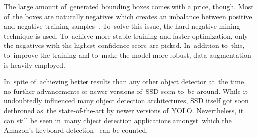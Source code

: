 The large amount of~generated bounding boxes comes with a price, though. Most of~the boxes are naturally negatives which creates an imbalance between positive and negative training samples~\cite{ssd-paper}. To~solve this issue, the hard negative mining technique is used. To~achieve more stable training and faster optimization, only the negatives with the highest confidence score are picked. In~addition to~this, to~improve the training and to~make the model more robust, data augmentation is heavily employed.

In~spite of~achieving better results than any other object detector at~the time, no further advancements or newer versions of~SSD seem to~be around. While it undoubtedly influenced many object detection architectures, SSD itself got soon dethroned as~the state-of-the-art by newer versions of~YOLO. Nevertheless, it can still be seen in~many object detection applications amongst~which the Amazon's keyboard detection~\cite{amazon-paper} can be counted.